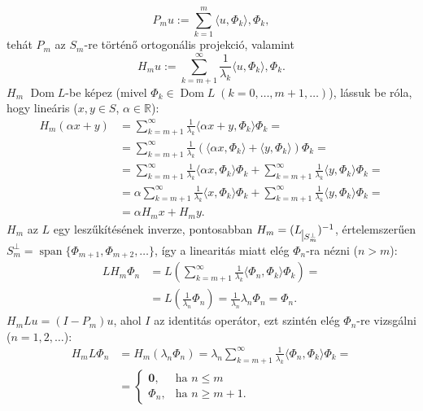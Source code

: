 \documentclass[oneside, titlepage, 12pt, a4paper]{report}
\DeclareMathOperator{\Dom}{Dom}	%
\DeclareMathOperator{\Span}{span}	%
\begin{document}
\begin{equation*}
P_m u := \sum_{k = 1}^m \langle u, \Phi_k \rangle, \Phi_k,
\end{equation*}
tehát $P_m$ az $S_m$-re történő ortogonális projekció, valamint
\begin{equation*}
H_m u := \sum_{k = m + 1}^\infty \frac{1}{\lambda_k} \langle u, \Phi_k \rangle, \Phi_k.
\end{equation*}
$H_m$ $\Dom L$-be képez (mivel $\Phi_k \in \Dom L \; (k = 0, \dots, m+1, \dots)$), lássuk be róla, hogy lineáris ($x, y \in S$, $\alpha \in \mathbb{R}$):
\begin{align*}
H_m(\alpha x + y) &= \sum_{k = m+1}^\infty \frac{1}{\lambda_k} \langle \alpha x + y, \Phi_k \rangle \Phi_k = \\
 &= \sum_{k = m+1}^\infty \frac{1}{\lambda_k} ( \langle \alpha x, \Phi_k \rangle + \langle y, \Phi_k \rangle ) \Phi_k = \\
 &= \sum_{k = m+1}^\infty \frac{1}{\lambda_k} \langle \alpha x, \Phi_k \rangle \Phi_k + \sum_{k = m+1}^\infty \frac{1}{\lambda_k} \langle y, \Phi_k \rangle \Phi_k = \\
 &= \alpha \sum_{k = m+1}^\infty \frac{1}{\lambda_k} \langle x, \Phi_k \rangle \Phi_k + \sum_{k = m+1}^\infty \frac{1}{\lambda_k} \langle y, \Phi_k \rangle \Phi_k = \\
 &= \alpha H_m x + H_m y.
\end{align*}
$H_m$ az $L$ egy leszűkítésének inverze, pontosabban $H_m = (L_{\mkern 1mu \vrule height 2ex\mkern2mu S_m^\perp})^{-1}$, értelemszerűen $S_m^\perp = \Span \{ \Phi_{m+1}, \Phi_{m+2}, \dots \}$, így a linearitás miatt elég $\Phi_n$-ra nézni ($n > m$):
\begin{align*}
L H_m \Phi_n &= L \left( \sum_{k = m+1}^\infty \frac{1}{\lambda_k} \langle \Phi_n, \Phi_k \rangle \Phi_k \right) = \\
 &= L \left( \frac{1}{\lambda_n} \Phi_n \right) = \frac{1}{\lambda_n} \lambda_n \Phi_n = \Phi_n.
\end{align*}
$H_m L u = (I - P_m)u$, ahol $I$ az identitás operátor, ezt szintén elég $\Phi_n$-re vizsgálni ($n = 1, 2, \dots$):
\begin{align*}
H_m L \Phi_n &= H_m (\lambda_n \Phi_n) = \lambda_n \sum_{k = m+1}^\infty \frac{1}{\lambda_k} \langle \Phi_n, \Phi_k \rangle \Phi_k = \\
 &=
	\begin{cases}
		\mathbf{0}, &\text{ha } n \leq m \\
		\Phi_n, &\text{ha } n \geq m + 1.
	\end{cases}
\end{align*}
\end{document}
